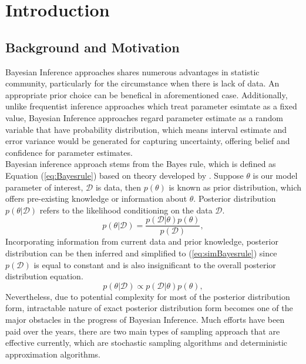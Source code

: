 \chapter{Introduction}
\label{Chapter1}
\section{Background and Motivation}
Bayesian Inference approaches shares numerous advantages in statistic community, particularly for the circumstance when there is lack of data. An appropriate prior choice can be benefical in aforementioned case. Additionally, unlike frequentist inference approaches which treat parameter esimtate as a fixed value, Bayesian Inference approaches regard parameter estimate as a random variable that have probability distribution, which means interval estimate and error variance would be generated for capturing uncertainty, offering belief and confidence for parameter estimates.\\ Bayesian inference approach stems from the Bayes rule, which is defined as Equation (\ref{eq:Bayesrule}) based on theory developed by \cite{Beech1959}. Suppose $\theta$ is our model parameter of interest, $\mathcal{D}$ is data, then $p(\theta)$ is known as prior distribution, which offers pre-existing knowledge or information about $\theta$. Posterior distribution $p(\theta|\mathcal{D})$ refers to the likelihood conditioning on the data $\mathcal{D}$.
\begin{equation}
	p(\theta|\mathcal{D}) = \frac{p(\mathcal{D}|\theta)p(\theta)}{p(\mathcal{D})},
	\label{eq:Bayesrule}
\end{equation}
Incorporating information from current data and prior knowledge, posterior distribution can be then inferred and simplified to (\ref{eq:simBayesrule}) since $p(\mathcal{D})$ is equal to constant and is also insignificant to the overall posterior distribution equation.
\begin{equation}
	p(\theta|\mathcal{D}) \propto p(\mathcal{D}|\theta)p(\theta),
	\label{eq:simBayesrule}
\end{equation}
Nevertheless, due to potential complexity for most of the posterior distribution form, intractable nature of exact posterior distribution form becomes one of the major obstacles in the progress of Bayesian Inference. Much efforts have been paid over the years, there are two main types of sampling approach that are effective currently, which are stochastic sampling algorithms and deterministic approximation algorithms. \\
